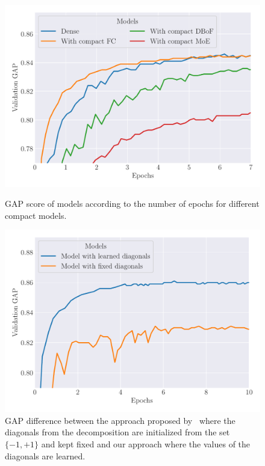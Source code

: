 \begin{figure}[p!]
  \centering
  \includegraphics[width=\scalefigure\textwidth]{figures/appendix/ap2-training_video_classification/graph_compact_layers}
  \caption{GAP score of models according to the number of epochs for different compact models.}
  \label{figure:ap2-learning_curve_layers}
  \vspace{2cm}
  \includegraphics[width=\scalefigure\textwidth]{figures/appendix/ap2-training_video_classification/graph_comparison_learned_diagonal}
  \caption{GAP difference between the approach proposed by~\citet{cheng2015exploration} where the diagonals from the decomposition are initialized from the set $\{-1, +1\}$ and kept fixed and our approach where the values of the diagonals are learned.} 
  \label{figure:ap2-learning_dc_cd}
\end{figure}

